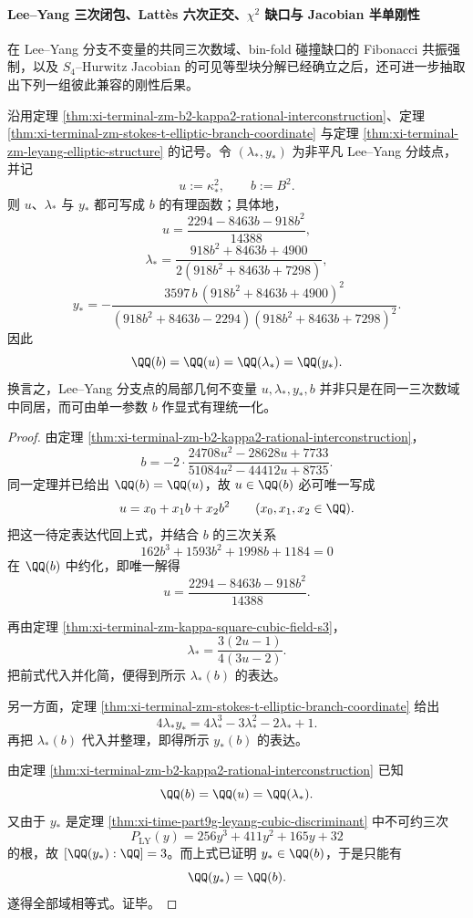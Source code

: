 \paragraph{Lee--Yang 三次闭包、Latt\`es 六次正交、\texorpdfstring{$\chi^2$}{chi2} 缺口与 Jacobian 半单刚性}
在 Lee--Yang 分支不变量的共同三次数域、bin-fold 碰撞缺口的 Fibonacci 共振强制，以及 \(S_4\)--Hurwitz Jacobian 的可见等型块分解已经确立之后，还可进一步抽取出下列一组彼此兼容的刚性后果。

\begin{theorem}\label{thm:xi-time-part65b-leyang-branch-b-birational-uniformization}
沿用定理 \ref{thm:xi-terminal-zm-b2-kappa2-rational-interconstruction}、定理 \ref{thm:xi-terminal-zm-stokes-t-elliptic-branch-coordinate} 与定理 \ref{thm:xi-terminal-zm-leyang-elliptic-structure} 的记号。令 \((\lambda_*,y_*)\) 为非平凡 Lee--Yang 分歧点，并记
\[
u:=\kappa_*^2,
\qquad
b:=B^2.
\]
则 \(u\)、\(\lambda_*\) 与 \(y_*\) 都可写成 \(b\) 的有理函数；具体地，
\[
u=\frac{2294-8463b-918b^2}{14388},
\]
\[
\lambda_*
=
\frac{918b^2+8463b+4900}{2(918b^2+8463b+7298)},
\]
\[
y_*
=
-\frac{3597\,b\,(918b^2+8463b+4900)^2}
{(918b^2+8463b-2294)(918b^2+8463b+7298)^2}.
\]
因此
\[
\QQ(b)=\QQ(u)=\QQ(\lambda_*)=\QQ(y_*).
\]
换言之，Lee--Yang 分支点的局部几何不变量 \(u,\lambda_*,y_*,b\) 并非只是在同一三次数域中同居，而可由单一参数 \(b\) 作显式有理统一化。
\end{theorem}
\begin{proof}
由定理 \ref{thm:xi-terminal-zm-b2-kappa2-rational-interconstruction}，
\[
b
=
-2\cdot
\frac{24708u^2-28628u+7733}{51084u^2-44412u+8735}.
\]
同一定理并已给出 \(\QQ(b)=\QQ(u)\)，故 \(u\in \QQ(b)\) 必可唯一写成
\[
u=x_0+x_1b+x_2b^2
\qquad (x_0,x_1,x_2\in \QQ).
\]
把这一待定表达代回上式，并结合 \(b\) 的三次关系
\[
162b^3+1593b^2+1998b+1184=0
\]
在 \(\QQ(b)\) 中约化，即唯一解得
\[
u=\frac{2294-8463b-918b^2}{14388}.
\]

再由定理 \ref{thm:xi-terminal-zm-kappa-square-cubic-field-s3}，
\[
\lambda_*=\frac{3(2u-1)}{4(3u-2)}.
\]
把前式代入并化简，便得到所示 \(\lambda_*(b)\) 的表达。

另一方面，定理 \ref{thm:xi-terminal-zm-stokes-t-elliptic-branch-coordinate} 给出
\[
4\lambda_*y_*=4\lambda_*^3-3\lambda_*^2-2\lambda_*+1.
\]
再把 \(\lambda_*(b)\) 代入并整理，即得所示 \(y_*(b)\) 的表达。

由定理 \ref{thm:xi-terminal-zm-b2-kappa2-rational-interconstruction} 已知
\[
\QQ(b)=\QQ(u)=\QQ(\lambda_*).
\]
又由于 \(y_*\) 是定理 \ref{thm:xi-time-part9g-leyang-cubic-discriminant} 中不可约三次
\[
P_{\mathrm{LY}}(y)=256y^3+411y^2+165y+32
\]
的根，故 \([\QQ(y_*):\QQ]=3\)。而上式已证明 \(y_*\in \QQ(b)\)，于是只能有
\[
\QQ(y_*)=\QQ(b).
\]
遂得全部域相等式。证毕。
\end{proof}


